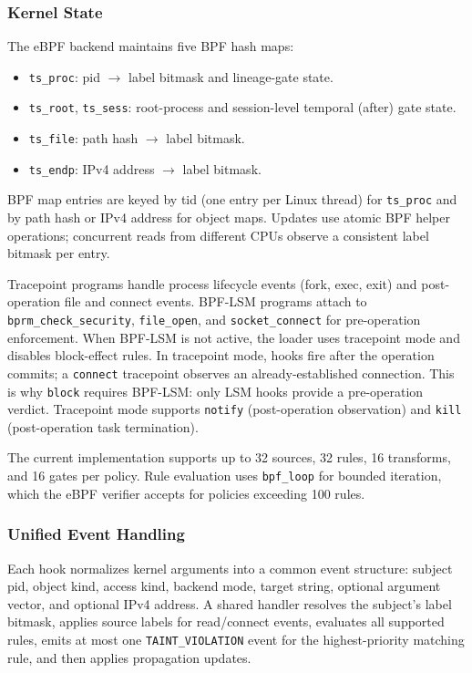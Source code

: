 \subsubsection{Kernel State}

The eBPF backend maintains five BPF hash maps:

\begin{itemize}
\item \texttt{ts\_proc}: pid $\to$ label bitmask and lineage-gate state.
\item \texttt{ts\_root}, \texttt{ts\_sess}: root-process and session-level
temporal (after) gate state.
\item \texttt{ts\_file}: path hash $\to$ label bitmask.
\item \texttt{ts\_endp}: IPv4 address $\to$ label bitmask.
\end{itemize}

BPF map entries are keyed by tid (one entry per Linux thread) for
\texttt{ts\_proc} and by path hash or IPv4 address for object maps.
Updates use atomic BPF helper operations; concurrent reads from different
CPUs observe a consistent label bitmask per entry.

Tracepoint programs handle process lifecycle events (fork, exec, exit) and
post-operation file and connect events. BPF-LSM programs attach to
\texttt{bprm\_check\_security}, \texttt{file\_open}, and
\texttt{socket\_connect} for pre-operation enforcement. When BPF-LSM is not
active, the loader uses tracepoint mode and disables block-effect rules.
In tracepoint mode, hooks fire after the operation commits; a
\texttt{connect} tracepoint observes an already-established connection.
This is why \texttt{block} requires BPF-LSM: only LSM hooks
provide a pre-operation verdict. Tracepoint mode supports \texttt{notify}
(post-operation observation) and \texttt{kill} (post-operation task
termination).

The current implementation supports up to 32 sources, 32 rules, 16
transforms, and 16 gates per policy. Rule evaluation uses
\texttt{bpf\_loop} for bounded iteration, which the eBPF verifier accepts
for policies exceeding 100 rules.

\subsubsection{Unified Event Handling}

Each hook normalizes kernel arguments into a common event structure:
subject pid, object kind, access kind, backend mode, target string,
optional argument vector, and optional IPv4 address. A shared handler
resolves the subject's label bitmask, applies source labels for
read/connect events, evaluates all supported rules, emits at most one
\texttt{TAINT\_VIOLATION} event for the highest-priority matching rule, and
then applies propagation updates.

